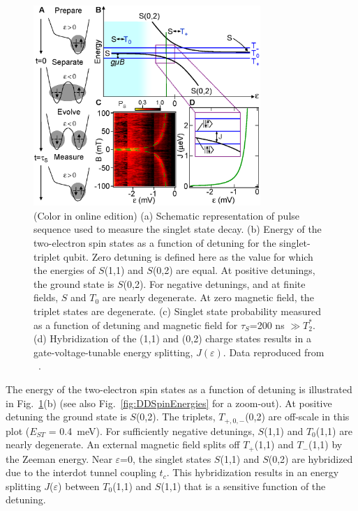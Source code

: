 \documentclass[12pt,aps,nofootinbib]{revtex4-1}
\begin{document}
\begin{figure}[htb]
\includegraphics[width=8.6cm]{hanson_fig46.eps}
\caption{(Color in online edition) (a) Schematic representation of pulse sequence used to
measure the singlet state decay. (b) Energy of the two-electron
spin states as a function of detuning for the singlet-triplet
qubit. Zero detuning is defined here as the value for which the energies of $S$(1,1) and $S$(0,2) are equal. At positive detunings, the ground
state is $S$(0,2). For negative detunings, and at finite fields,
$S$ and $T_{0}$ are nearly degenerate. At zero
magnetic field, the triplet states are degenerate. (c) Singlet state
probability measured as a function of detuning and magnetic field
for $\tau_S$=200 ns $\gg$$T_2^*$. (d) Hybridization of the (1,1)
and (0,2) charge states results in a gate-voltage-tunable energy
splitting, $J(\varepsilon)$. Data
reproduced from ~\textcite{petta05}.}\vspace{-0.5 cm} \label{Fig:PettaST}
\end{figure}

The energy of the two-electron spin states as a function of
detuning is illustrated in Fig.~\ref{Fig:PettaST}(b) (see also Fig.~\ref{fig:DDSpinEnergies} for a zoom-out). At
positive detuning the ground state is $S$(0,2). The triplets,
$T_{+,0,-}$(0,2) are off-scale in this plot ($E_{ST}$ = 0.4~meV). For sufficiently negative detunings, $S$(1,1) and
$T_0$(1,1) are nearly degenerate. An external magnetic field splits off
$T_+$(1,1) and $T_-$(1,1) by the Zeeman energy. Near $\varepsilon$=0,
the singlet states $S$(1,1) and $S$(0,2) are hybridized due to the
interdot tunnel coupling $t_c$. This hybridization results in an
energy splitting $J$($\varepsilon$) between $T_0$(1,1) and $S$(1,1) that
is a sensitive function of the detuning.
\end{document}
